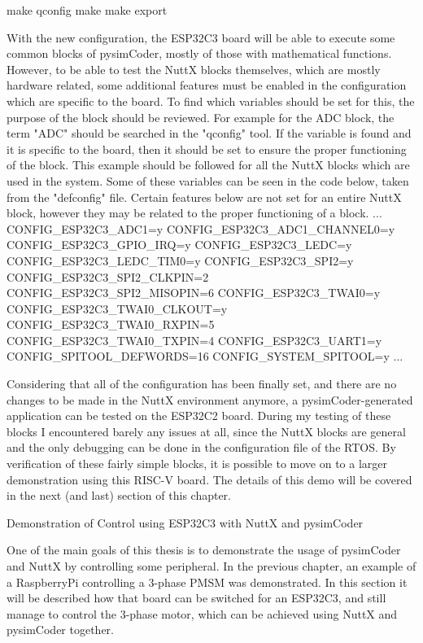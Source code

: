 \begtt
make qconfig
make
make export
\endtt

\quad With the new configuration, the ESP32C3 board will be able to execute some common blocks of
pysimCoder, mostly of those with mathematical functions. However, to be able to test the NuttX blocks
themselves, which are mostly hardware related, some additional features must be enabled in the
configuration which are specific to the board. To find which variables should be set for this, the
purpose of the block should be reviewed. For example for the ADC block, the term "ADC" should be searched
in the "qconfig" tool. If the variable is found and it is specific to the board, then it should be set
to ensure the proper functioning of the block. This example should be followed for all the NuttX blocks
which are used in the system. Some of these variables can be seen in the code below, taken from the
"defconfig" file. Certain features below are not set for an entire NuttX block, however they may be
related to the proper functioning of a block. 
\begtt
...
CONFIG_ESP32C3_ADC1=y
CONFIG_ESP32C3_ADC1_CHANNEL0=y
CONFIG_ESP32C3_GPIO_IRQ=y
CONFIG_ESP32C3_LEDC=y
CONFIG_ESP32C3_LEDC_TIM0=y
CONFIG_ESP32C3_SPI2=y
CONFIG_ESP32C3_SPI2_CLKPIN=2
CONFIG_ESP32C3_SPI2_MISOPIN=6
CONFIG_ESP32C3_TWAI0=y
CONFIG_ESP32C3_TWAI0_CLKOUT=y
CONFIG_ESP32C3_TWAI0_RXPIN=5
CONFIG_ESP32C3_TWAI0_TXPIN=4
CONFIG_ESP32C3_UART1=y
CONFIG_SPITOOL_DEFWORDS=16
CONFIG_SYSTEM_SPITOOL=y
...
\endtt

\quad Considering that all of the configuration has been finally set, and there are no changes to be made
in the NuttX environment anymore, a pysimCoder-generated application can be tested on the ESP32C2 board.
During my testing of these blocks I encountered barely any issues at all, since the NuttX blocks are general
and the only debugging can be done in the configuration file of the RTOS. By verification of these fairly
simple blocks, it is possible to move on to a larger demonstration using this RISC-V board. The details
of this demo will be covered in the next (and last) section of this chapter. 


\sec Demonstration of Control using ESP32C3 with NuttX and pysimCoder

\qquad One of the main goals of this thesis is to demonstrate the usage of pysimCoder and NuttX by
controlling some peripheral. In the previous chapter, an example of a RaspberryPi controlling a 3-phase PMSM
was demonstrated. In this section it will be described how that board can be switched for an ESP32C3, and
still manage to control the 3-phase motor, which can be achieved using NuttX and pysimCoder together.

